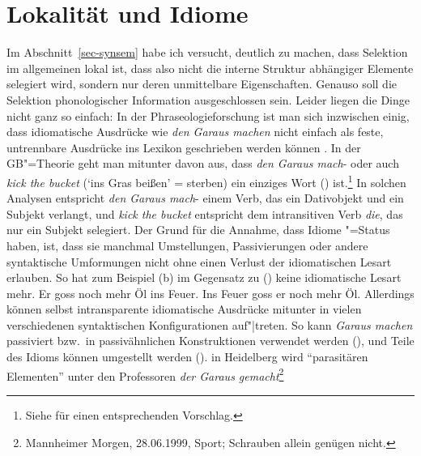 \section{Lokalität und Idiome}
\label{disc-lokalitaet}

%
Im Abschnitt~\ref{sec-synsem} habe ich versucht, deutlich zu machen, dass Selektion im allgemeinen
lokal ist, dass also nicht die interne Struktur abhängiger Elemente selegiert
wird, sondern nur deren unmittelbare Eigenschaften. Genauso soll die Selektion phonologischer
Information ausgeschlossen sein. Leider liegen die Dinge nicht ganz so einfach:
In der Phraseologieforschung ist man sich inzwischen einig, dass idiomatische Ausdrücke wie
\emph{den Garaus machen} nicht einfach als feste, untrennbare Ausdrücke ins Lexikon geschrieben werden
können \citep*{NSW94a,Burger98a}. In der GB"=Theorie geht man mitunter davon aus, dass \emph{den Garaus mach}- oder
auch \emph{kick the bucket} (`ins Gras beißen' = sterben) ein einziges Wort (\vnull) ist.\footnote{
  Siehe \zb {} für einen entsprechenden Vorschlag.%
}
In solchen Analysen entspricht \emph{den Garaus mach}- einem Verb, das ein Dativobjekt und ein Subjekt verlangt,
und \emph{kick the bucket} entspricht dem intransitiven Verb \emph{die}, das nur ein Subjekt
selegiert. Der Grund für die Annahme, dass Idiome \vnull"=Status haben, ist, dass sie manchmal
Umstellungen, Passivierungen oder andere syntaktische Umformungen nicht ohne einen Verlust der
idiomatischen Lesart erlauben. So hat zum Beispiel (b) im Gegensatz zu () keine
idiomatische Lesart mehr.
\eal
\ex Er goss noch mehr Öl ins Feuer.
\ex Ins Feuer goss er noch mehr Öl.
\zl
Allerdings können selbst intransparente idiomatische Ausdrücke mitunter in vielen verschiedenen syntaktischen Konfigurationen auf"|treten.
So kann \emph{Garaus machen} \zb passiviert bzw.\ in passivähnlichen Konstruktionen
verwendet werden (), und Teile des Idioms können umgestellt werden ().
\ea
in Heidelberg wird "`parasitären Elementen"' unter den Professoren \emph{der Garaus gemacht}\footnote{
Mannheimer Morgen, 28.06.1999, Sport; Schrauben allein genügen nicht.%
}
\z

